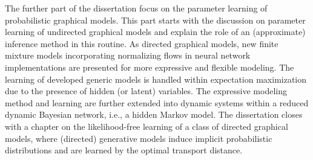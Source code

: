 The further part of the dissertation focus on the parameter learning of probabilistic graphical models. This part starts with the discussion on parameter learning of undirected graphical models and explain the role of an (approximate) inference method in this routine. As directed graphical models, new finite mixture models incorporating normalizing flows in neural network implementations are presented for more expressive and flexible modeling. The learning of developed generic models is handled within expectation maximization due to the presence of hidden (or latent) variables. The expressive modeling method and learning are further extended into dynamic systems within a reduced dynamic Bayesian network, i.e., a hidden Markov model. The dissertation closes with a chapter on the likelihood-free learning of a class of directed graphical models, where (directed) generative models induce implicit probabilistic distributions and are learned by the optimal transport distance.


